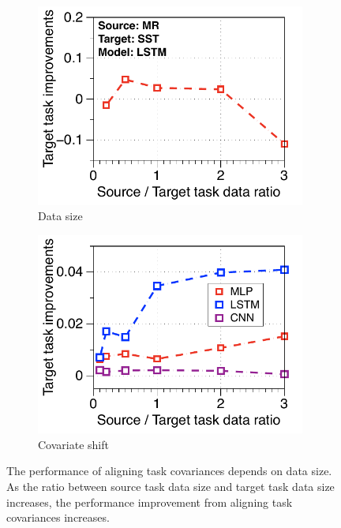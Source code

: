 \begin{figure}[!t]
	\centering
		\begin{subfigure}[b]{0.33\textwidth}
		\centering
		\includegraphics[width=0.975\textwidth]{figures/ratio_norm_sst_trec_lstm.pdf}
		\caption{Data size}
	\end{subfigure}
	\begin{subfigure}[b]{0.33\textwidth}
		\centering
		\includegraphics[width=0.975\textwidth]{figures/ratio_alignment_norm_diff_all.pdf}
		\caption{Covariate shift}
	\end{subfigure}
	\caption{The performance of aligning task covariances depends on data size. As the ratio between source task data size and target task data size increases, the performance improvement from aligning task covariances increases.}
	\label{fig_ablation}
\end{figure}

